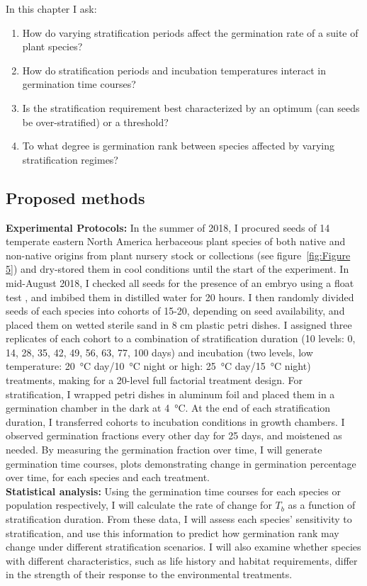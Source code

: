 \documentclass[12pt]{article}\usepackage[]{graphicx}\usepackage[]{color}
\begin{document}
\indent In this chapter I ask:
\begin{enumerate}
\item How do varying stratification periods affect the germination rate of a suite of plant species? 
\item How do stratification periods and incubation temperatures interact in germination time courses?
\item Is the stratification requirement best characterized by an optimum (can seeds be over-stratified) or a threshold?
\item To what degree is germination rank between species affected by varying stratification regimes?
\end{enumerate}
\subsection*{Proposed methods}
\indent\indent\textbf{Experimental Protocols:} In the summer of 2018, I procured seeds of 14 temperate eastern North America herbaceous plant species of both native and non-native origins from plant nursery stock or collections (see figure~\ref{fig:Figure 5}) and dry-stored them in cool conditions until the start of the experiment. In mid-August 2018, I checked all seeds for the presence of an embryo using a float test \citep{Baskin2014}, and imbibed them in distilled water for 20 hours. I then randomly divided seeds of each species into cohorts of 15-20, depending on seed availability, and placed them on wetted sterile sand in 8 cm plastic petri dishes. I assigned three replicates of each cohort to a combination of stratification duration (10 levels: 0, 14, 28, 35, 42, 49, 56, 63, 77, 100 days) and incubation (two levels, low temperature: \SI{20}{\degreeCelsius} day/\SI{10}{\degreeCelsius} night or high: \SI{25}{\degreeCelsius} day/\SI{15}{\degreeCelsius} night) treatments, making for a 20-level full factorial treatment design. For stratification, I wrapped petri dishes in aluminum foil and placed them in a germination chamber in the dark at \SI{4}{\degreeCelsius}. At the end of each stratification duration, I transferred cohorts to incubation conditions in growth chambers. I observed germination fractions every other day for 25 days, and moistened as needed. By measuring the germination fraction over time, I will generate germination time courses, plots demonstrating change in germination percentage over time, for each species and each treatment.\\
\indent\textbf{Statistical analysis:} Using the germination time courses for each species or population respectively, I will calculate the rate of change for $T_b$ as a function of stratification duration. From these data, I will assess each species' sensitivity to stratification, and use this information to predict how germination rank may change under different stratification scenarios. I will also examine whether species with different characteristics, such as life history and habitat requirements, differ in the strength of their response to the environmental treatments.\\
\end{document}
